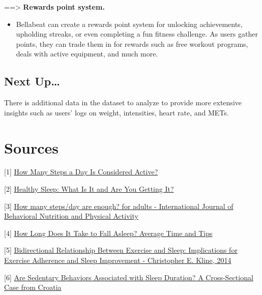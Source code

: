 \documentclass[
]{article}
\providecommand{\tightlist}{%
  \setlength{\itemsep}{0pt}\setlength{\parskip}{0pt}}
\begin{document}
==\textgreater{} \textbf{Rewards point system.}

\begin{itemize}
\tightlist
\item
  Bellabeat can create a rewards point system for unlocking
  achievements, upholding streaks, or even completing a fun fitness
  challenge. As users gather points, they can trade them in for rewards
  such as free workout programs, deals with active equipment, and much
  more.
\end{itemize}

\hypertarget{next-up}{%
\subsection{Next Up\ldots{}}\label{next-up}}

There is additional data in the dataset to analyze to provide more
extensive insights such as users' logs on weight, intensities, heart
rate, and METs.

\hypertarget{sources}{%
\section{Sources}\label{sources}}

{[}1{]}
\href{https://www.medicinenet.com/how_many_steps_a_day_is_considered_active/article.htm}{How
Many Steps a Day Is Considered Active?}

{[}2{]}
\href{https://www.sleepfoundation.org/sleep-hygiene/what-is-healthy-sleep}{Healthy
Sleep: What Is It and Are You Getting It?}

{[}3{]}
\href{https://ijbnpa.biomedcentral.com/articles/10.1186/1479-5868-8-79\#:~:text=In\%20summary\%2C\%20at\%20least\%20in,populace\%20\%5B3\%2C\%2023\%5D}{How
many steps/day are enough? for adults - International Journal of
Behavioral Nutrition and Physical Activity}

{[}4{]}
\href{https://www.healthline.com/health/healthy-sleep/how-long-does-it-take-to-fall-asleep\#:~:text=It\%20should\%20take\%20between\%2010,fall\%20asleep\%20much\%20more\%20quickly}{How
Long Does It Take to Fall Asleep? Average Time and Tips}

{[}5{]}
\href{https://journals.sagepub.com/doi/abs/10.1177/1559827614544437}{Bidirectional
Relationship Between Exercise and Sleep: Implications for Exercise
Adherence and Sleep Improvement - Christopher E. Kline, 2014}

{[}6{]} \href{https://www.ncbi.nlm.nih.gov/pmc/articles/PMC6352043/}{Are
Sedentary Behaviors Associated with Sleep Duration? A Cross-Sectional
Case from Croatia}
\end{document}
